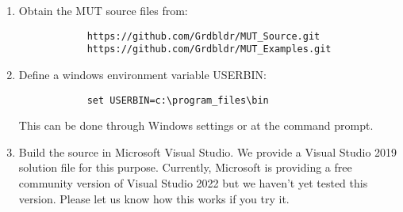 \begin{enumerate}
    \item Obtain the MUT source files from:
        \begin{verbatim}
            https://github.com/Grdbldr/MUT_Source.git
            https://github.com/Grdbldr/MUT_Examples.git
        \end{verbatim}

    \item Define a windows environment variable USERBIN:
        \begin{verbatim}
            set USERBIN=c:\program_files\bin
        \end{verbatim}
        This can be done through Windows settings or at the command prompt.   

    \item Build the source in Microsoft Visual Studio.  We provide a Visual Studio 2019 solution file for this purpose. Currently, Microsoft is providing a free community version of Visual Studio 2022 but we haven't yet tested this version.  Please let us know how this works if you try it.

\end{enumerate}   
